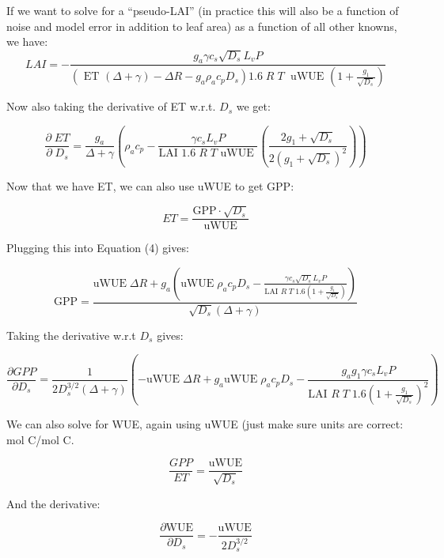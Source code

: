 If we want to solve for a ``pseudo-LAI'' (in practice this will also be a function of noise and model error in addition to leaf area) as a function of all other knowns, we have:
\begin{equation}
LAI  = - \frac{g_a \gamma c_s \sqrt{D_s} L_v P }{ \left(\text{ ET } ( \Delta + \gamma) - \Delta R - g_a \rho_a c_p D_{s}\right) 1.6 \; R\; T\; \text{ uWUE } (1 + \frac{g_1}{\sqrt{D_s}})}
\end{equation}

Now also taking the derivative of ET w.r.t. $D_s$ we get:

\begin{equation}
\frac{\partial \;  ET}{\partial \; D_s} = \frac{g_a}{\Delta + \gamma}   \left( \rho_a c_p - \frac{\gamma c_s L_v  P }{\text{LAI }1.6 \; R\; T \text{ uWUE }} \left( \frac{2 g_1 + \sqrt{D_s}}{2 (g_1 + \sqrt{D_s})^2}\right) \right)
\end{equation}

Now that we have ET, we can also use uWUE to get GPP:

\begin{equation}
  ET = \frac{\text{GPP} \cdot \sqrt{D_s}}{  \text{uWUE}}
\end{equation}

Plugging this into Equation (4) gives:

\begin{equation}
  \text{GPP} = \frac{\text{uWUE}\; \Delta R + g_a \left( \text{uWUE}\; \rho_a c_p D_{s} - \frac{\gamma c_s \sqrt{D_s} L_v P }{\text{LAI } R \; T \; 1.6  (1 + \frac{g_1}{\sqrt{D_s}})} \right) }{ \sqrt{D_s} \left(\Delta + \gamma \right)}
\end{equation}

Taking the derivative w.r.t $D_s$ gives:

\begin{equation}
  \frac{\partial GPP}{\partial D_s} = \frac{1}{2 D_s^{3/2} \left(\Delta + \gamma \right)} \left( -\text{uWUE}\; \Delta R + g_a \text{uWUE}\; \rho_a c_p  D_s - \frac{g_a g_1  \gamma c_s L_v P }{\text{LAI } R \; T \; 1.6 ( 1 + \frac{g_1}{\sqrt{D_s}})^2 } \right)
\end{equation}

We can also solve for WUE, again using uWUE (just make sure units are correct: mol C/mol C.

\begin{equation}
\frac{GPP}{ET} = \frac{\text{uWUE}}{\sqrt{D_s}}
\end{equation}

And the derivative:

\begin{equation}
  \frac{\partial \text{WUE}}{\partial D_s} = -\frac{\text{uWUE}}{2 D_s^{3/2}}
\end{equation}


